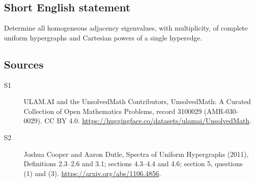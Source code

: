 \documentclass[11pt]{article}
\begin{document}
\subsection{Short English statement}
Determine all homogeneous adjacency eigenvalues, with multiplicity, of complete uniform hypergraphs and Cartesian powers of a single hyperedge.
\subsection{Sources}
\begin{description}
\item[\hypertarget{source:3100029:1}{S1}] ULAM.AI and the UnsolvedMath Contributors, UnsolvedMath: A Curated Collection of Open Mathematics Problems, record 3100029 (AMR-030-0029). CC BY 4.0. \url{https://huggingface.co/datasets/ulamai/UnsolvedMath}.
\item[\hypertarget{source:3100029:2}{S2}] Joshua Cooper and Aaron Dutle, Spectra of Uniform Hypergraphs (2011), Definitions 2.3--2.6 and 3.1; sections 4.3--4.4 and 4.6; section 5, questions (1) and (3). \url{https://arxiv.org/abs/1106.4856}.
\end{description}
\label{end:3100029}
\end{document}
